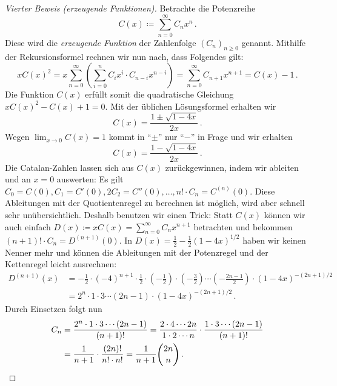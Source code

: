 \begin{proof}[Vierter Beweis \textmd{(erzeugende Funktionen)}]
	Betrachte die Potenzreihe
	\begin{equation*}
		C(x)\coloneqq\sum_{n= 0}^{\infty}C_nx^n\,.
	\end{equation*}
	Diese wird die \emph{erzeugende Funktion} der Zahlenfolge $(C_n)_{n\geqslant 0}$ genannt. Mithilfe der Rekursionsformel rechnen wir nun nach, dass Folgendes gilt:
	\begin{equation*}
		xC(x)^2=x\sum_{n=0}^\infty\left(\sum_{i=0}^nC_ix^i\cdot C_{n-i}x^{n-i}\right)=\sum_{n=0}^\infty C_{n+1}x^{n+1}=C(x)-1\,.
	\end{equation*}
	Die Funktion $C(x)$ erfüllt somit die quadratische Gleichung $xC(x)^2-C(x)+1=0$. Mit der üblichen Lösungsformel erhalten wir
	\begin{equation*}
		C(x)=\frac{1\pm\sqrt{1-4x}}{2x}\,.
	\end{equation*}
	Wegen $\lim_{x\to0}C(x)=1$ kommt in \enquote{$\pm$} nur \enquote{$-$} in Frage und wir erhalten
	\begin{equation*}
		C(x)=\frac{1-\sqrt{1-4x}}{2x}\,.
	\end{equation*}
	Die Catalan-Zahlen lassen sich aus $C(x)$ zurückgewinnen, indem wir ableiten und an $x=0$ auswerten: Es gilt $C_0=C(0),C_1=C'(0),2C_2=C''(0),\dotsc,n!\cdot C_n=C^{(n)}(0)$. Diese Ableitungen mit der Quotientenregel zu berechnen ist möglich, wird aber schnell sehr unübersichtlich. Deshalb benutzen wir einen Trick: Statt $C(x)$ können wir auch einfach $D(x)\coloneqq xC(x)=\sum_{n=0}^\infty C_nx^{n+1}$ betrachten und bekommen $(n+1)!\cdot C_n=D^{(n+1)}(0)$. In $D(x)=\frac12-\frac12(1-4x)^{1/2}$ haben wir keinen Nenner mehr und können die Ableitungen mit der Potenzregel und der Kettenregel leicht ausrechnen:
	\begin{align*}
		D^{(n+1)}(x)&=-\frac12\cdot (-4)^{n+1}\cdot \frac12\cdot\left(-\frac12\right)\cdot\left(-\frac{3}{2}\right)\dotsm\left(-\frac{2n-1}{2}\right)\cdot\left(1-4x\right)^{-(2n+1)/2}\\
		&=2^{n}\cdot 1\cdot 3\dotsm(2n-1)\cdot \left(1-4x\right)^{-(2n+1)/2}\,.
	\end{align*}
	Durch Einsetzen folgt nun
	\begin{align*}
		C_n&=\frac{2^{n}\cdot 1\cdot 3\dotsm(2n-1)}{(n+1)!}=\frac{2\cdot 4\dotsm 2n}{1\cdot 2\dotsm n}\cdot\frac{1\cdot 3\dotsm (2n-1)}{(n+1)!}\\
		&=\frac{1}{n+1}\cdot\frac{(2n)!}{n!\cdot n!}=\frac{1}{n+1}\binom{2n}{n}\,.\qedhere
	\end{align*}
\end{proof}
